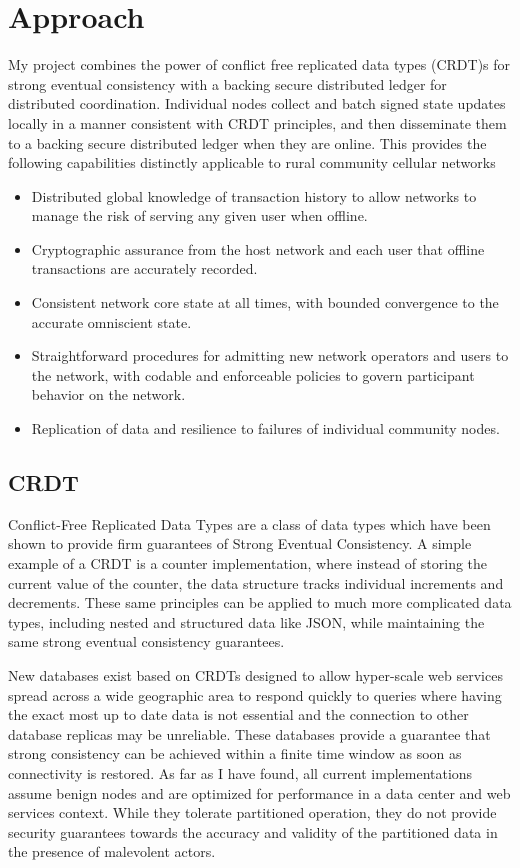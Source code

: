 \section{Approach}

My project combines the power of conflict free replicated data types
(CRDT)s for strong eventual consistency with a backing secure
distributed ledger for distributed coordination. Individual nodes
collect and batch signed state updates locally in a manner consistent
with CRDT principles, and then disseminate them to a backing secure
distributed ledger when they are online. This provides the following
capabilities distinctly applicable to rural community cellular networks

\begin{itemize}
\item Distributed global knowledge of transaction history to allow
  networks to manage the risk of serving any given user when offline.
\item Cryptographic assurance from the host network and each user that
  offline transactions are accurately recorded.
\item Consistent network core state at all times, with bounded
  convergence to the accurate omniscient state.
\item Straightforward procedures for admitting new network operators
  and users to the network, with codable and enforceable policies to
  govern participant behavior on the network.
\item Replication of data and resilience to failures of individual
  community nodes.
\end{itemize}

\subsection{CRDT}
Conflict-Free Replicated Data Types are a class of data types which
have been shown to provide firm guarantees of Strong Eventual
Consistency.\cite{ShapiroConflictfreereplicateddata2011} A simple
example of a CRDT is a counter implementation, where instead of
storing the current value of the counter, the data structure tracks
individual increments and decrements. These same principles can be
applied to much more complicated data types, including nested and
structured data like JSON, while maintaining the same strong eventual
consistency guarantees.\cite{KleppmannConflictFreeReplicatedJSON2017}

New databases exist based on CRDTs designed to allow hyper-scale web
services spread across a wide geographic area to respond quickly to
queries where having the exact most up to date data is not essential
and the connection to other database replicas may be
unreliable.\cite{DatanetNewCRDT16} These databases provide a guarantee
that strong consistency can be achieved within a finite time window as
soon as connectivity is restored. As far as I have found, all current
implementations assume benign nodes and are optimized for performance
in a data center and web services context. While they tolerate
partitioned operation, they do not provide security guarantees towards
the accuracy and validity of the partitioned data in the presence of
malevolent actors.

